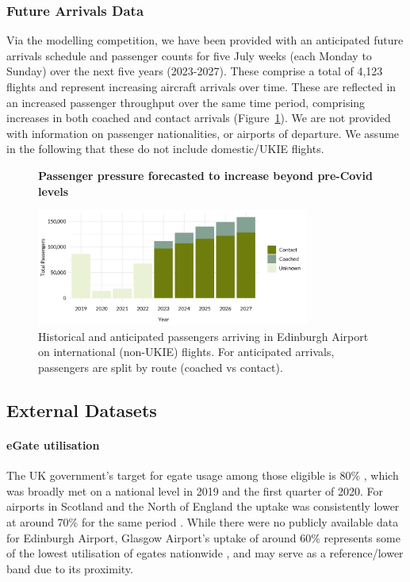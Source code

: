 \documentclass[10pt]{article}
\newcommand*{\figuretitle}[1]{%
    {\centering%
    \textbf{#1}%
    \par\medskip}%
}
\begin{document}
\subsubsection{Future Arrivals Data} \label{sec:future_arrivals_data}
Via the modelling competition, we have been provided with an anticipated future arrivals schedule and passenger counts for five July weeks (each Monday to Sunday) over the next five years (2023-2027). These comprise a total of 4,123 flights and represent increasing aircraft arrivals over time. These are reflected in an increased passenger throughput over the same time period, comprising increases in both coached and contact arrivals (Figure~\ref{fig:future_passenger_burden}). We are not provided with information on passenger nationalities, or airports of departure. We assume in the following that these do not include domestic/UKIE flights. 

% 


\begin{figure}[!ht]
    \centering
    \figuretitle{Passenger pressure forecasted to increase beyond pre-Covid levels}
    \includegraphics[width=0.8\textwidth]{figures/future_passenger_burden_fig.png}
     \caption{
     Historical and anticipated passengers arriving in Edinburgh Airport on international (non-UKIE) flights. For anticipated arrivals, passengers are split by route (coached vs contact).} \label{fig:future_passenger_burden}
\end{figure}

\subsection{External Datasets} \label{sec:observed_arrivals_data}

\paragraph{eGate utilisation}
The UK government's target for \gls{egate} usage among those eligible is 80\% \cite{UK_border_2025}, which was broadly met on a national level in 2019 and the first quarter of 2020. For airports in Scotland and the North of England the uptake was consistently lower at around 70\% for the same period \cite{Inspection_eGates}. While there were no publicly available data for Edinburgh Airport, Glasgow Airport's uptake of around 60\% represents some of the lowest utilisation of \glspl{egate} nationwide \cite{Inspection_eGates}, and may serve as a reference/lower band due to its proximity.
\end{document}
